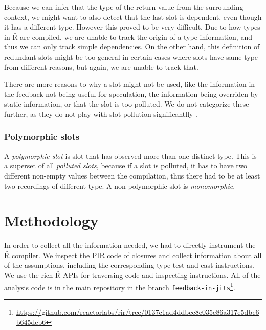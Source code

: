 Because we can infer that the type of the return value from the surrounding context, we might want to also detect that the last slot is dependent, even though it has a different type. However this proved to be very difficult. Due to how types in Ř are compiled, we are unable to track the origin of a type information, and thus we can only track simple dependencies. On the other hand, this definition of redundant slots might be too general in certain cases where slots have same type from different reasons, but again, we are unable to track that. 

There are more reasons to why a slot might not be used, like the information in the feedback not being useful for speculation, the information being overriden by static information, or that the slot is too polluted. We do not categorize these further, as they do not play with slot pollution significantlly .

\subsubsection*{Polymorphic slots}

A \textit{polymorphic slot} is slot that has observed more than one distinct type. This is a superset of all \textit{polluted slots}, because if a slot is polluted, it has to have two different non-empty values between the compilation, thus there had to be at least two recordings of different type. A non-polymorphic slot is \textit{monomorphic}.

\section{Methodology}

In order to collect all the information needed, we had to directly instrument the Ř compiler. We inspect the PIR code of closures and collect information about all of the assumptions, including the corresponding type test and cast instructions. We use the rich Ř APIs for traversing code and inspecting instructions. All of the analysis code is in the main repository in the branch \texttt{feedback-in-jits}\footnote{\url{https://github.com/reactorlabs/rir/tree/0137c1ad4ddbcc8e035e86a317e5dbe6b645deb6}}.

